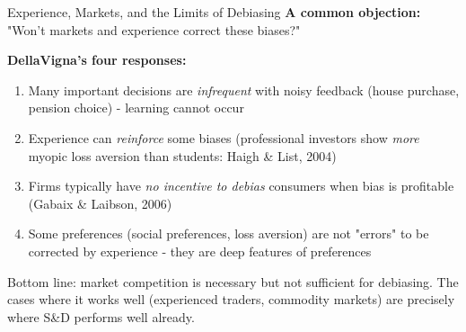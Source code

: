\documentclass[10pt]{beamer}
\begin{document}
\begin{frame}{Experience, Markets, and the Limits of Debiasing}
\textbf{A common objection:} "Won't markets and experience correct these biases?"


\textbf{DellaVigna's four responses:}

\begin{enumerate}
\item Many important decisions are \emph{infrequent} with noisy feedback (house purchase, pension choice) - learning cannot occur
\item Experience can \emph{reinforce} some biases (professional investors show \emph{more} myopic loss aversion than students: Haigh \& List, 2004)
\item Firms typically have \emph{no incentive to debias} consumers when bias is profitable (Gabaix \& Laibson, 2006)
\item Some preferences (social preferences, loss aversion) are not "errors" to be corrected by experience - they are deep features of preferences
\end{enumerate}


\alert{Bottom line:} market competition is necessary but not sufficient for debiasing. The cases where it works well (experienced traders, commodity markets) are precisely where S\&D performs well already.
\end{frame}
\end{document}
